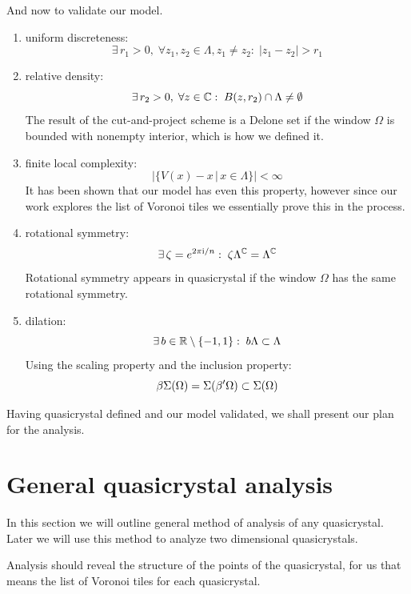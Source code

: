 \documentclass[text.tex]{subfiles}
\begin{document}
And now to validate our model. 

\begin{enumerate}
\item uniform discreteness: $$\exists\,r_1>0,\; \forall z_1,z_2\in\Lambda, z_1\neq z_2:\; |z_1-z_2|>r_1$$
\item relative density: $$\exists\,r_2>0,\; \forall z\in\mathbb{C}:\; B(z,r_2)\cap\Lambda \neq \emptyset$$
The result of the cut-and-project scheme is a Delone set if the window $\Omega$ is bounded with nonempty interior, which is how we defined it. 
\item finite local complexity: $$\big|\{V(x)-x\,|\, x\in \Lambda\}\big|<\infty$$
It has been shown that our model has even this property, however since our work explores the list of Voronoi tiles we essentially prove this in the process. 
\item rotational symmetry: $$\exists\,\zeta = e^{2\pi \mathrm{i}/n}:\; \zeta\Lambda^{\mathbb{C}} = \Lambda^{\mathbb{C}}$$
Rotational symmetry appears in quasicrystal if the window $\Omega$ has the same rotational symmetry.
\item dilation: $$\exists\,b\in\mathbb{R}\setminus\{-1,1\}:\; b\Lambda\subset \Lambda$$
Using the scaling property and the inclusion property:
$$\beta\Sigma(\Omega) = \Sigma(\beta'\Omega) \subset \Sigma(\Omega)$$
\end{enumerate}

Having quasicrystal defined and  our model validated, we shall present our plan for the analysis. 

\section{General quasicrystal analysis}
In this section we will outline general method of analysis of any quasicrystal. Later we will use this method to analyze two dimensional quasicrystals. 

Analysis should reveal the structure of the points of the quasicrystal, for us that means the list of Voronoi tiles for each quasicrystal. 
\end{document}
